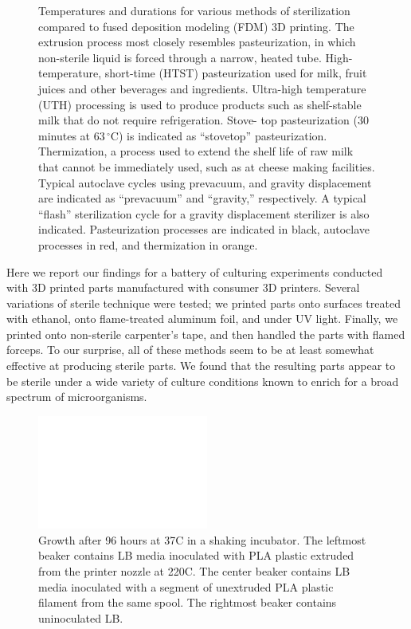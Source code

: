 \documentclass[fleqn,10pt]{wlpeerj}
\begin{document}
\begin{figure}
\begin{minipage}[c]{0.40\linewidth}
    \par\vspace{0pt}
    \end{minipage}

    \caption{Temperatures and durations for various methods of sterilization
compared to fused deposition modeling (FDM) 3D printing. The extrusion process
most closely resembles pasteurization, in which non-sterile liquid is forced
through a narrow, heated tube. High- temperature, short-time (HTST)
pasteurization used for milk, fruit juices and other beverages and
ingredients. Ultra-high temperature (UTH) processing is used to produce
products such as shelf-stable milk that do not require refrigeration. Stove-
top pasteurization (30 minutes at 63$\,^{\circ}\mathrm{C}$) is indicated as
``stovetop'' pasteurization. Thermization, a process used to extend the shelf
life of raw milk that cannot be immediately used, such as at cheese making
facilities. Typical autoclave cycles using prevacuum, and gravity displacement
are indicated as ``prevacuum'' and ``gravity,'' respectively. A typical
``flash'' sterilization cycle for a gravity displacement sterilizer is also
indicated. Pasteurization processes are indicated in black, autoclave
processes in red, and thermization in orange.} 

\label{fig:pasteurization}
\end{figure}

Here we report our findings for a battery of culturing experiments conducted
with 3D printed parts manufactured with consumer 3D printers. Several
variations of sterile technique were tested; we printed parts onto surfaces
treated with ethanol, onto flame-treated aluminum foil, and under UV light.
Finally, we printed onto non-sterile carpenter's tape, and then handled the
parts with flamed forceps. To our surprise, all of these methods seem to be at
least somewhat effective at producing sterile parts. We found that the
resulting parts appear to be sterile under a wide variety of culture
conditions known to enrich for a broad spectrum of microorganisms.

\begin{figure}
  \centering
    \includegraphics[width=0.5\textwidth]{Fig2}

    \caption{ Growth after 96 hours at 37C in a shaking incubator. The 
    leftmost beaker contains LB media inoculated with PLA plastic extruded
    from the printer nozzle at 220C. The center beaker contains LB media
    inoculated with a segment of unextruded PLA plastic filament from the same
    spool. The rightmost beaker contains uninoculated LB.}
    
    \label{fig:preliminary}
\end{figure}
\end{document}
